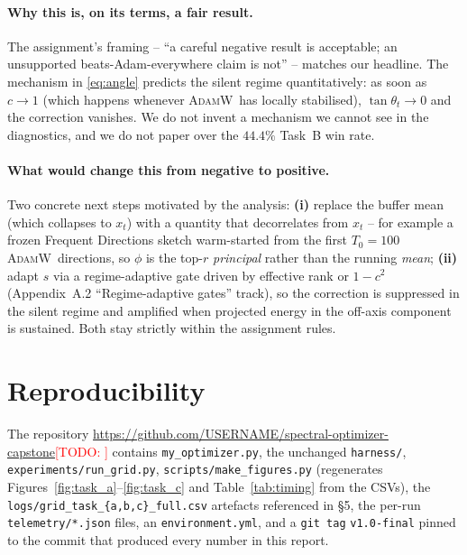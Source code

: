 \documentclass{article}
\newcommand{\todo}[1]{\textcolor{red}{[TODO: #1]}}
\newcommand{\Adamw}{\textsc{AdamW}}
\begin{document}
\paragraph{Why this is, on its terms, a fair result.}
The assignment's framing -- ``a careful negative result is
acceptable; an unsupported beats-Adam-everywhere claim is not'' --
matches our headline.  The mechanism in \eqref{eq:angle} predicts
the silent regime quantitatively: as soon as $c \to 1$ (which
happens whenever \Adamw\ has locally stabilised), $\tan\theta_t \to
0$ and the correction vanishes.  We do not invent a mechanism we
cannot see in the diagnostics, and we do not paper over the
$44.4\%$ Task~B win rate.

\paragraph{What would change this from negative to positive.}
Two concrete next steps motivated by the analysis:
\textbf{(i)} replace the buffer mean (which collapses to $x_t$)
with a quantity that decorrelates from $x_t$ -- for example a frozen
Frequent Directions sketch warm-started from the first $T_0=100$
\Adamw\ directions, so $\phi$ is the top-$r$ \emph{principal} rather
than the running \emph{mean};
\textbf{(ii)} adapt $s$ via a regime-adaptive gate driven by
effective rank or $1-c^2$ (Appendix~A.2 ``Regime-adaptive gates''
track), so the correction is suppressed in the silent regime and
amplified when projected energy in the off-axis component is
sustained.  Both stay strictly within the assignment rules.

\section{Reproducibility}

The repository
\url{https://github.com/USERNAME/spectral-optimizer-capstone}\todo{}
contains \texttt{my\_optimizer.py}, the unchanged
\texttt{harness/}, \texttt{experiments/run\_grid.py},
\texttt{scripts/make\_figures.py} (regenerates
Figures~\ref{fig:task_a}--\ref{fig:task_c} and
Table~\ref{tab:timing} from the CSVs), the
\texttt{logs/grid\_task\_\{a,b,c\}\_full.csv} artefacts referenced
in §5, the per-run \texttt{telemetry/*.json} files, an
\texttt{environment.yml}, and a \texttt{git tag} \texttt{v1.0-final}
pinned to the commit that produced every number in this report.
\end{document}
